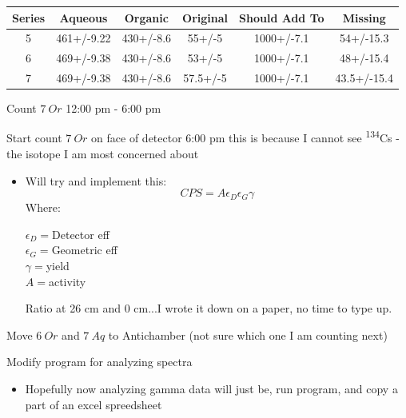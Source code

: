 \documentclass[idxtotoc,hyperref,openany,oneside]{labbook} %
\newcommand{\cmark}{\ding{51}}%
\newcommand{\done}{\rlap{$\square$}{\raisebox{2pt}{\large\hspace{1pt}\cmark}}%
  \hspace{-2.5pt}}
\newcommand{\tss}{\textsuperscript}
\begin{document}
\begin{center}
  \begin{tabular}{||c c c c c c||}
    \hline
    Series & Aqueous & Organic & Original & Should Add To & Missing\\ [0.5ex]
    \hline\hline
    5 & 461+/-9.22 & 430+/-8.6 & 55+/-5 & 1000+/-7.1 & 54+/-15.3\\
    \hline
    6 & 469+/-9.38 & 430+/-8.6 & 53+/-5 & 1000+/-7.1 & 48+/-15.4\\
    \hline
    7 & 469+/-9.38 & 430+/-8.6 & 57.5+/-5 & 1000+/-7.1 & 43.5+/-15.4\\
    \hline
  \end{tabular}
\end{center}

\begin{todolist}
\item[\done]{Count $\boxed{7\ Or}$ 12:00 pm - 6:00 pm}
\item[\done]{Start count $\boxed{7\ Or}$ on face of detector 6:00 pm
  this is because I cannot see \tss{134}Cs - the isotope I am
  most concerned about}
  \begin{itemize}
  \item{Will try and implement this:}
    $$CPS=A\epsilon_D\epsilon_G\gamma$$
    Where:
    \begin{center}
    $\epsilon_D=$Detector eff\\
    $\epsilon_G=$Geometric eff\\
    $\gamma=$yield\\
      $A=$activity
    \end{center}
    Ratio at 26 cm and 0 cm...I wrote it down on a paper,
    no time to type up.
  \end{itemize}
\item[\done]{Move $\boxed{6\ Or}$ and $\boxed{7\ Aq}$ to Antichamber
  (not sure which one I am counting next)}
\end{todolist}

\begin{todolist}
\item[\done]{Modify program for analyzing spectra}
  \begin{itemize}
  \item{Hopefully now analyzing gamma data will just be,
    run program, and copy a part of an excel spreedsheet}
  \end{itemize}
\end{todolist}

\end{document}

